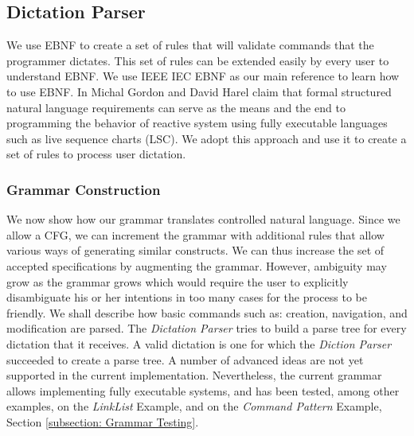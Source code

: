 \subsection{Dictation Parser} \label{subsec: Dictation Parser}
We use EBNF to create a set of rules that will validate commands that the programmer dictates. This set of rules can be extended easily by every user to understand EBNF. We use IEEE IEC EBNF \cite{IEEEBNF1996} as our main reference to learn how to use EBNF. In \cite[pages 51-86]{Michal2009} Michal Gordon and David Harel claim that formal structured natural language requirements can serve as the means and the end to programming the behavior of reactive system using fully executable languages such as live sequence charts (LSC). We adopt this approach and use it to create a set of rules to process user dictation.

\subsubsection{Grammar Construction}
We now show how our grammar translates controlled natural language. Since we allow a CFG, we can increment the grammar with additional rules that allow various ways of generating similar constructs. We can thus increase the set of accepted specifications by augmenting the grammar. However, ambiguity may grow as the grammar grows which would require the user to explicitly disambiguate his or her intentions in too many cases for the process to be friendly. We shall describe how basic commands such as: creation, navigation, and modification are parsed. The \textit{Dictation Parser} tries to build a parse tree for every dictation that it receives. A valid dictation is one for which the \textit{Diction Parser} succeeded to create a parse tree. A number of advanced ideas are not yet supported in the current implementation. Nevertheless, the current grammar allows implementing fully executable systems, and has been tested, among other examples, on the \textit{LinkList} Example, and on the \textit{Command Pattern} Example, Section \ref{subsection: Grammar Testing}.


